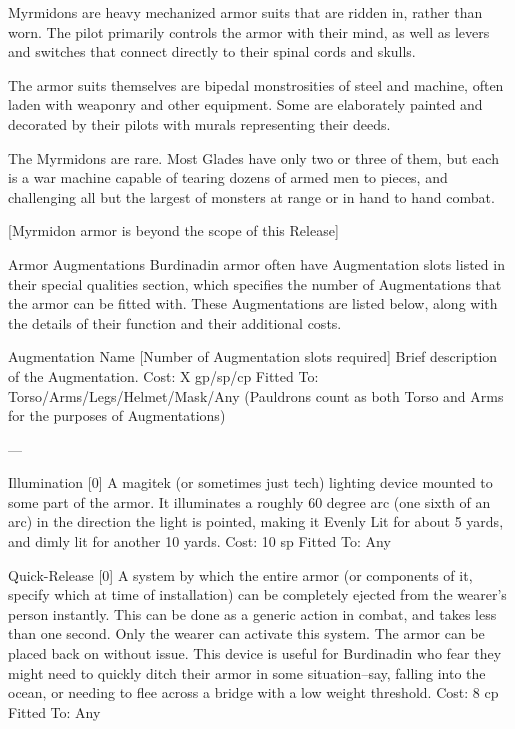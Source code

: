 \documentclass[oneside,11pt,english]{book}
\begin{document}
Myrmidons are heavy mechanized armor suits that are ridden in, rather than worn. The pilot primarily 
controls the armor with their mind, as well as levers and switches that connect directly to their spinal 
cords and skulls. 

 

The armor suits themselves are bipedal monstrosities of steel and machine, often laden with weaponry 
and other equipment. Some are elaborately painted and decorated by their pilots with murals representing 
their deeds. 

 

The Myrmidons are rare. Most Glades have only two or three of them, but each is a war machine capable 
of tearing dozens of armed men to pieces, and challenging all but the largest of monsters at range or in 
hand to hand combat. 

 


[Myrmidon armor is beyond the scope of this Release] 

 

Armor Augmentations 
Burdinadin armor often have Augmentation slots listed in their special qualities section, which specifies 
the number of Augmentations that the armor can be fitted with. These Augmentations are listed below, 
along with the details of their function and their additional costs. 

 

Augmentation Name [Number of Augmentation slots required] 
Brief description of the Augmentation. 
Cost: X gp/sp/cp 
Fitted To: Torso/Arms/Legs/Helmet/Mask/Any 
(Pauldrons count as both Torso and Arms for the purposes of Augmentations) 

 

--- 

 

Illumination [0] 
A magitek (or sometimes just tech) lighting device mounted to some part of the armor. It illuminates a 
roughly 60 degree arc (one sixth of an arc) in the direction the light is pointed, making it Evenly Lit for 
about 5 yards, and dimly lit for another 10 yards. 
Cost: 10 sp 
Fitted To: Any 

 

Quick-Release [0] 
A system by which the entire armor (or components of it, specify which at time of installation) can be 
completely ejected from the wearer’s person instantly. This can be done as a generic action in combat, 
and takes less than one second. Only the wearer can activate this system. The armor can be placed back 
on without issue. This device is useful for Burdinadin who fear they might need to quickly ditch their 
armor in some situation--say, falling into the ocean, or needing to flee across a bridge with a low weight 
threshold. 
Cost: 8 cp 
Fitted To: Any 
\end{document}
